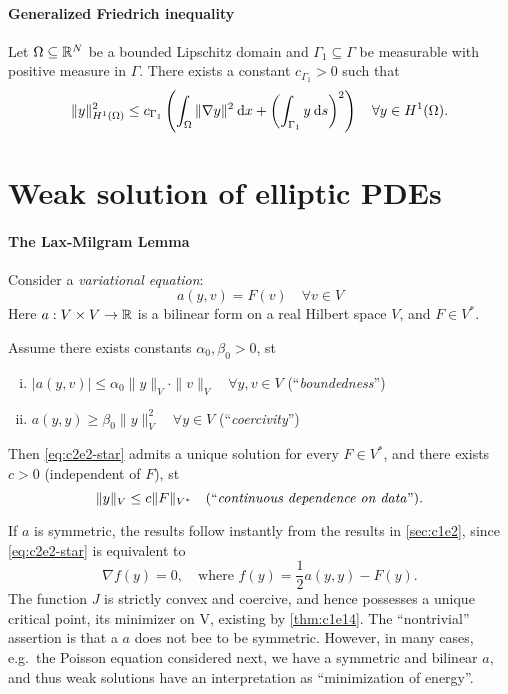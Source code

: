 \documentclass[../skript.tex]{subfiles}
\begin{document}
\paragraph{Generalized Friedrich inequality}
\begin{theorem} %
\label{thm:c2e9}
Let $\Omega \subseteq \mathbb{R}^N$ be a bounded Lipschitz domain and $\Gamma_1 \subseteq \Gamma$ be measurable with positive measure in $\Gamma$. There exists a constant $c_{\Gamma_1} > 0$ such that
\[
	\| y \|_{H^1(\Omega)}^2 \leq c_{\Gamma_1} \left( \int_\Omega \| \nabla y \|^2 \:\mathrm{d}x + \left( \int_{\Gamma_1} y \:\mathrm{d}s \right)^2 \right) \quad \forall y \in H^1(\Omega).
\]
\end{theorem}
\section{Weak solution of elliptic PDEs} %
\label{sec:c2e2}
\paragraph{The Lax-Milgram Lemma}
Consider a \emph{variational equation}:
\begin{equation}
\label{eq:c2e2-star}
	\boxed{a(y, v) = F(v) \quad \forall v \in V}
	\tag{$\star$}
\end{equation}
Here $a : V \times V \to \mathbb{R}$ is a bilinear form on a real Hilbert space $V$, and $F \in V^*$.
\begin{theorem} %
\label{thm:c2e10}
Assume there exists constants $\alpha_0, \beta_0 > 0$, \ac{st}
\begin{enumerate}[(i)]
\item $|a(y, v)| \leq \alpha_0 \| y \|_V \cdot \| v \|_V \quad \forall y, v \in V$ (``\emph{boundedness}'')
\item $a(y,y) \geq \beta_0 \| y \|_V^2 \quad \forall y \in V$ (``\emph{coercivity}'')
\end{enumerate}
Then \cref{eq:c2e2-star} admits a unique solution for every $F \in V^*$, and there exists $c > 0$ (independent of $F$), \ac{st}
\[
	\| y \|_V \leq c \| F \|_{V^*} \quad \text{(``\emph{continuous dependence on data}'')}.
\]
\end{theorem}
\begin{remark} %
\label{rem:c2e11}
If $a$ is symmetric, the results follow instantly from the results in \cref{sec:c1e2}, since \cref{eq:c2e2-star} is equivalent to
\[
	\nabla f(y) = 0, \quad \text{where } f(y) = \frac{1}{2} a(y, y) - F(y).
\]
The function $J$ is strictly convex and coercive, and hence possesses a unique critical point, its minimizer on V, existing by \cref{thm:c1e14}.
The ``nontrivial'' assertion is that a $a$ does not bee to be symmetric.
However, in many cases, e.g.\ the Poisson equation considered next, we have a symmetric and bilinear $a$, and thus weak solutions have an interpretation as ``minimization of energy''. 
\end{remark}
\end{document}
